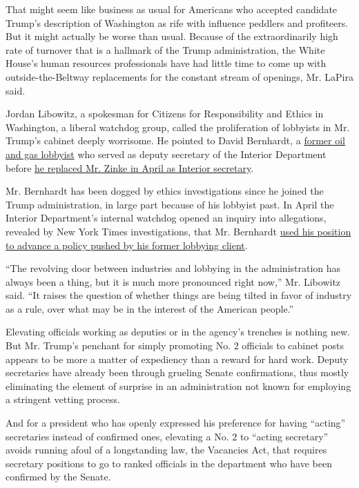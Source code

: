 That might seem like business as usual for Americans who accepted
candidate Trump's description of Washington as rife with influence
peddlers and profiteers. But it might actually be worse than usual.
Because of the extraordinarily high rate of turnover that is a hallmark
of the Trump administration, the White House's human resources
professionals have had little time to come up with outside-the-Beltway
replacements for the constant stream of openings, Mr. LaPira said.

Jordan Libowitz, a spokesman for Citizens for Responsibility and Ethics
in Washington, a liberal watchdog group, called the proliferation of
lobbyists in Mr. Trump's cabinet deeply worrisome. He pointed to David
Bernhardt, a
\href{https://www.nytimes3xbfgragh.onion/2019/03/26/us/politics/endangered-species-david-bernhardt.html}{former
oil and gas lobbyist} who served as deputy secretary of the Interior
Department before
\href{https://www.nytimes3xbfgragh.onion/2019/04/11/climate/bernhardt-interior-senate-confirmation.html}{he
replaced Mr. Zinke in April as Interior secretary}.

Mr. Bernhardt has been dogged by ethics investigations since he joined
the Trump administration, in large part because of his lobbyist past. In
April the Interior Department's internal watchdog opened an inquiry into
allegations, revealed by New York Times investigations, that Mr.
Bernhardt
\href{https://www.nytimes3xbfgragh.onion/2019/02/12/climate/david-bernhardt-endangered-species.html?module=inline}{used
his position to advance a policy pushed by his former lobbying client}.

``The revolving door between industries and lobbying in the
administration has always been a thing, but it is much more pronounced
right now,'' Mr. Libowitz said. ``It raises the question of whether
things are being tilted in favor of industry as a rule, over what may be
in the interest of the American people.''

Elevating officials working as deputies or in the agency's trenches is
nothing new. But Mr. Trump's penchant for simply promoting No. 2
officials to cabinet posts appears to be more a matter of expediency
than a reward for hard work. Deputy secretaries have already been
through grueling Senate confirmations, thus mostly eliminating the
element of surprise in an administration not known for employing a
stringent vetting process.

And for a president who has openly expressed his preference for having
``acting'' secretaries instead of confirmed ones, elevating a No. 2 to
``acting secretary'' avoids running afoul of a longstanding law, the
Vacancies Act, that requires secretary positions to go to ranked
officials in the department who have been confirmed by the Senate.

